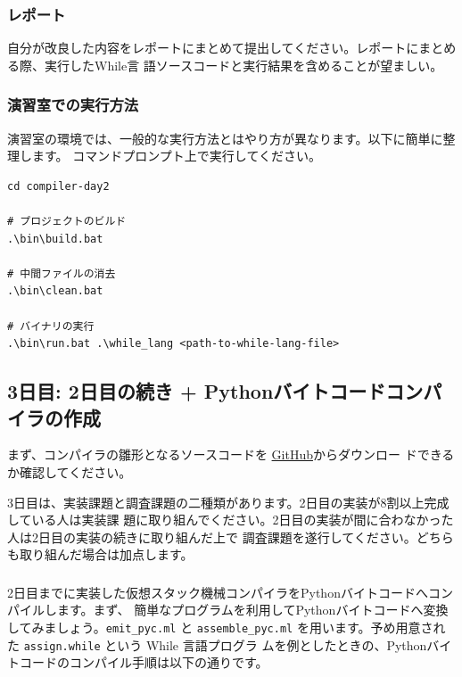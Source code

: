 \documentclass[a4paper,11pt]{jsarticle}
\begin{document}
\subsubsection{レポート}

自分が改良した内容をレポートにまとめて提出してください。レポートにまとめる際、実行したWhile言
語ソースコードと実行結果を含めることが望ましい。

\subsubsection{演習室での実行方法}

演習室の環境では、一般的な実行方法とはやり方が異なります。以下に簡単に整理します。
コマンドプロンプト上で実行してください。

\begin{lstlisting}
cd compiler-day2

# プロジェクトのビルド
.\bin\build.bat

# 中間ファイルの消去
.\bin\clean.bat

# バイナリの実行
.\bin\run.bat .\while_lang <path-to-while-lang-file>
\end{lstlisting}

\subsection{3日目: 2日目の続き + Pythonバイトコードコンパイラの作成}

まず、コンパイラの雛形となるソースコードを
\href{https://github.com/tmu-compiler-info-sys-exp-I/compiler-day3}{GitHub}からダウンロー
ドできるか確認してください。

3日目は、実装課題と調査課題の二種類があります。2日目の実装が8割以上完成している人は実装課
題に取り組んでください。2日目の実装が間に合わなかった人は2日目の実装の続きに取り組んだ上で
調査課題を遂行してください。どちらも取り組んだ場合は加点します。

\subsubsection{}

2日目までに実装した仮想スタック機械コンパイラをPythonバイトコードへコンパイルします。まず、
簡単なプログラムを利用してPythonバイトコードへ変換してみましょう。\verb|emit_pyc.ml| と
\verb|assemble_pyc.ml| を用います。予め用意された \verb|assign.while| という While 言語プログラ
ムを例としたときの、Pythonバイトコードのコンパイル手順は以下の通りです。
\end{document}
